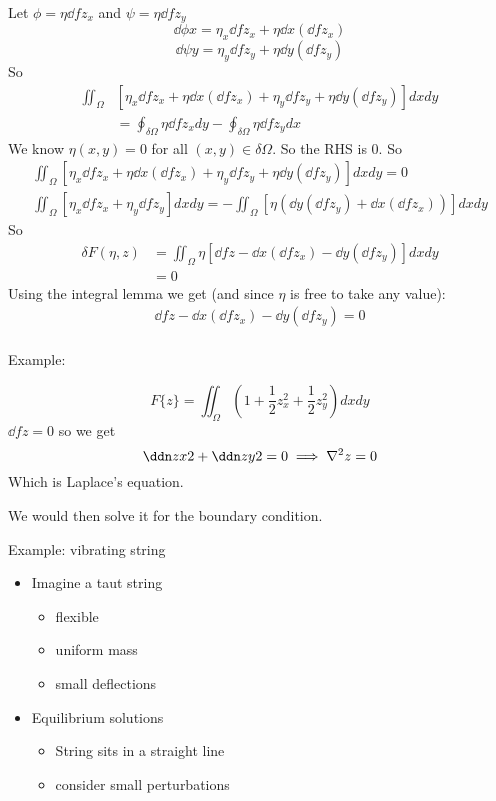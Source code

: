 \documentclass{E:/Documents/Latex/myassignment}
\begin{document}
Let $\phi = \eta \dd f{z_x}$ and $\psi = \eta \dd f{z_y}$
\[\dd \phi x = \eta_x \dd f{z_x} + \eta \dd{}x \left(\dd f{z_x}\right)\]
\[\dd \psi y = \eta_y \dd f{z_y} + \eta \dd{}y \left(\dd f{z_y}\right)\]
So
\begin{align*}
	\iint_{\Omega} &\left[\eta_x \dd f{z_x} + \eta \dd{}x\left(\dd f{z_x}\right) + \eta_y \dd f{z_y} + \eta \dd{}y \left(\dd f{z_y}\right)\right] dxdy\\
	&= \oint_{\delta \Omega} \eta \dd f{z_x} dy - \oint_{\delta\Omega} \eta \dd f{z_y} dx
\end{align*}
We know $\eta(x,y) = 0$ for all $(x,y) \in \delta \Omega$. So the RHS is $0$. So
\begin{align*}
	\iint_{\Omega} \left[\eta_x \dd f{z_x} + \eta \dd{}x\left(\dd f{z_x}\right) + \eta_y \dd f{z_y} + \eta \dd{}y \left(\dd f{z_y}\right)\right] dxdy =0\\
	\iint_{\Omega} \left[\eta_x \dd f{z_x} + \eta_y \dd f{z_y} \right] dxdy = -\iint_{\Omega} \left[ \eta \left(\dd{}y \left(\dd f{z_y}\right) + \dd{}x\left(\dd f{z_x}\right) \right)\right] dxdy
\end{align*}
So
\begin{align*}
	\delta F(\eta,z) &= \iint_{\Omega} \eta \left[\dd fz - \dd{}x \left(\dd f{z_x}\right) - \dd{}y \left(\dd f{z_y}\right)\right] dx dy\\
	&= 0 
\end{align*}
Using the integral lemma we get (and since $\eta$ is free to take any value):
\begin{align*}
	 \dd fz - \dd{}x \left(\dd f{z_x}\right) - \dd{}y \left(\dd f{z_y}\right)  =0\\
\end{align*}

Example:

\[F\{z\} = \iint_{\Omega} \left(1 + \frac12 z_x^2 + \frac12 z_y^2\right) dxdy\]
$\dd fz = 0 $ so we get
\[\ddn zx2 + \ddn zy2 = 0 \implies \nabla^2 z = 0\]
Which is Laplace's equation.

We would then solve it for the boundary condition.

Example: vibrating string

\begin{itemize}
	\item Imagine a taut string
	\begin{itemize}
		\item flexible
		\item uniform mass
		\item small deflections
	\end{itemize}
	\item Equilibrium solutions
	\begin{itemize}
		\item String sits in a straight line
		\item consider small perturbations
	\end{itemize}
\end{itemize}
\end{document}
